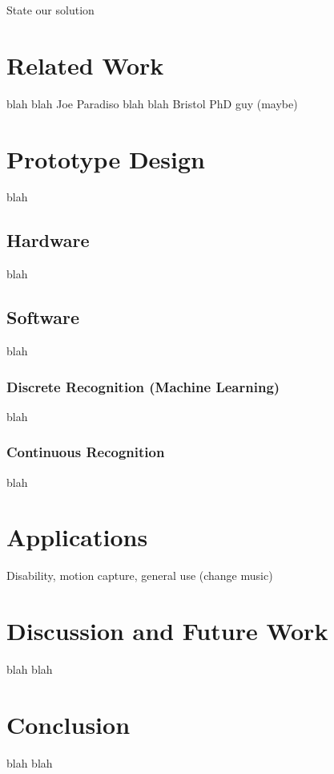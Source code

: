 \documentclass{sigchi}
\begin{document}
State our solution

\section{Related Work}
blah blah Joe Paradiso blah blah Bristol PhD guy (maybe)

\section{Prototype Design}
blah
\subsection{Hardware}
blah
\subsection{Software}
blah
\subsubsection{Discrete Recognition (Machine Learning)}
blah
\subsubsection{Continuous Recognition}
blah

\section{Applications}
Disability, motion capture, general use (change music)

\section{Discussion and Future Work}
blah blah

\section{Conclusion}
blah blah

\nocite{*}


\end{document}
